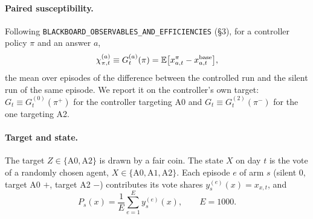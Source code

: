 \documentclass[10pt,a4paper]{article}
\begin{document}
\paragraph{Paired susceptibility.} Following \texttt{BLACKBOARD\_OBSERVABLES\_AND\_EFFICIENCIES} (\S3), for a
controller policy $\pi$ and an answer $a$,
\begin{equation}\label{eq:chi}
\chi^{(a)}_{\pi,t} \equiv G^{(a)}_t(\pi) = \mathbb E\bigl[x^{\pi}_{a,t} - x^{\rm base}_{a,t}\bigr],
\end{equation}
the mean over episodes of the difference between the controlled run and the silent run of the same episode. We
report it on the controller's own target: $G_t \equiv G^{(0)}_t(\pi^{+})$ for the controller targeting A0 and
$G_t \equiv G^{(2)}_t(\pi^{-})$ for the one targeting A2.

\paragraph{Target and state.} The target $Z \in \{\text{A0}, \text{A2}\}$ is drawn by a fair coin. The state $X$
on day $t$ is the vote of a randomly chosen agent, $X \in \{\text{A0},\text{A1},\text{A2}\}$. Each episode $e$ of arm $s$
(silent 0, target A0 $+$, target A2 $-$) contributes its vote shares $y^{(e)}_s(x) = x_{x,t}$, and
\begin{equation}\label{eq:P}
P_s(x) = \frac1E\sum_{e=1}^{E} y^{(e)}_s(x), \qquad E = 1000 .
\end{equation}
\end{document}
